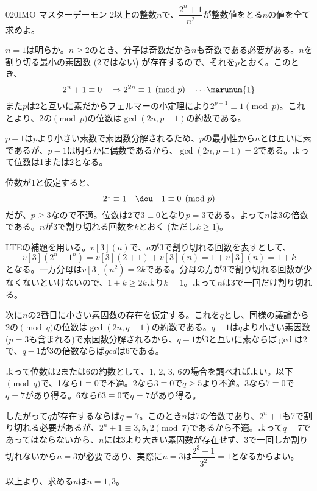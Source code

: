 \begin{thm}{020}{}{IMO マスターデーモン}
 2以上の整数$n$で、$\dfrac{2^n+1}{n^2}$が整数値をとる$n$の値を全て求めよ。 \\
\end{thm}

$n=1$は明らか。$n\ge 2$のとき、分子は奇数だから$n$も奇数である必要がある。$n$を割り切る最小の素因数 (2ではない) が存在するので、それを$p$とおく。このとき、
\[ 2^n+1\equiv 0 \quad\Rightarrow 2^{2n}\equiv 1 \pmod{p} \quad \cdots \marunum{1} \]
また$p$は2と互いに素だからフェルマーの小定理により$2^{p-1}\equiv 1 \pmod{p}$。これとより、2の$\pmod{p}$の位数は$\gcd(2n, p-1)$の約数である。

$p-1$は$p$より小さい素数で素因数分解されるため、$p$の最小性から$n$とは互いに素であるが、$p-1$は明らかに偶数であるから、$\gcd(2n, p-1)=2$である。よって位数は1または2となる。

位数が1と仮定すると、
\[ 2^1\equiv 1 \quad\dou\quad 1\equiv 0 \pmod{p} \]
だが、$p\ge 3$なので不適。位数は2で$3\equiv 0$となり$p=3$である。よって$n$は3の倍数である。$n$が3で割り切れる回数を$k$とおく (ただし$k\ge 1$)。

LTEの補題を用いる。$v[3](a)$で、$a$が3で割り切れる回数を表すとして、
\[ v[3](2^n+1^n)=v[3](2+1)+v[3](n)=1+v[3](n)=1+k \]
となる。一方分母は$v[3](n^2)=2k$である。分母の方が3で割り切れる回数が少なくないといけないので、$1+k\ge 2k$より$k=1$。よって$n$は3で一回だけ割り切れる。

次に$n$の2番目に小さい素因数の存在を仮定する。これを$q$とし、同様の議論から2の$\pmod{q}$の位数は$\gcd(2n, q-1)$の約数である。$q-1$は$q$より小さい素因数($p=3$も含まれる)で素因数分解されるから、$q-1$が3と互いに素ならば$\gcd$は2で、$q-1$が3の倍数ならば$gcd$は6である。

よって位数は2または6の約数として、1, 2, 3, 6の場合を調べればよい。以下$\pmod{q}$で、1なら$1\equiv 0$で不適。2なら$3\equiv 0$で$q\ge 5$より不適。3なら$7\equiv 0$で$q=7$があり得る。6なら$63\equiv 0$で$q=7$があり得る。

したがって$q$が存在するならば$q=7$。このとき$n$は7の倍数であり、$2^n+1$も7で割り切れる必要があるが、$2^n+1\equiv 3, 5, 2 \pmod{7}$であるから不適。よって$q=7$であってはならないから、$n$には3より大きい素因数が存在せず、3で一回しか割り切れないから$n=3$が必要であり、実際に$n=3$は$\dfrac{2^3+1}{3^2}=1$となるからよい。

以上より、求める$n$は$n=1, 3$。